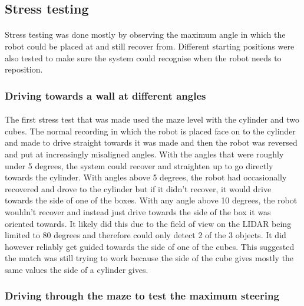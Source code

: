 \subsection{Stress testing}
\paragraph{}
Stress testing was done mostly by observing the maximum angle in which the robot could be placed at and still recover from. Different starting positions were also tested to make sure the system could recognise when the robot needs to reposition.

\subsubsection{Driving towards a wall at different angles}
\paragraph{}
The first stress test that was made used the maze level with the cylinder and two cubes. The normal recording in which the robot is placed face on to the cylinder and made to drive straight towards it was made and then the robot was reversed and put at increasingly misaligned angles. With the angles that were roughly under 5 degrees, the system could recover and straighten up to go directly towards the cylinder. With angles above 5 degrees, the robot had occasionally recovered and drove to the cylinder but if it didn't recover, it would drive towards the side of one of the boxes. With any angle above 10 degrees, the robot wouldn't recover and instead just drive towards the side of the box it was oriented towards. It likely did this due to the field of view on the LIDAR being limited to 80 degrees and therefore could only detect 2 of the 3 objects. It did however reliably get guided towards the side of one of the cubes. This suggested the match was still trying to work because the side of the cube gives mostly the same values the side of a cylinder gives.

\subsubsection{Driving through the maze to test the maximum steering}
